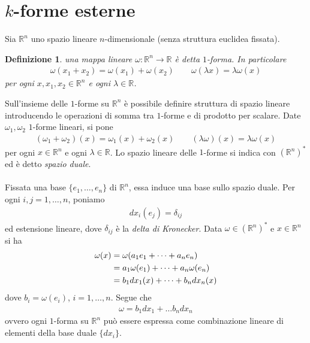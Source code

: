 \documentclass[oneside, 11pt]{amsbook}
\newcommand{\0}{{(0)}}
\newcommand{\3}{{(3)}}
\theoremstyle{colonplain}
\theoremstyle{colondefinition}
\newtheorem{defn}[thm]{Definizione}
\theoremstyle{colonremark}
\numberwithin{equation}{chapter}
\begin{document}
\section{\texorpdfstring{$k$-forme esterne}{Pk-forme esterne}}
Sia $\mathbb{R}^n$ uno spazio lineare $n$-dimensionale (senza struttura euclidea fissata).
\begin{defn} una mappa lineare $\omega : \mathbb{R}^n \longrightarrow \mathbb{R}$ è detta $1$-\textit{forma}. In particolare 
\begin{align}
    \omega(x_1 + x_2) = \omega(x_1) + \omega(x_2) \qquad \omega(\lambda x) = \lambda\omega(x) 
\end{align}
per ogni $x, x_1, x_2 \in \mathbb{R}^n$ e ogni $\lambda \in \mathbb{R}$.
\end{defn}
Sull'insieme delle $1$-forme su $\mathbb{R}^n$ è possibile definire struttura di spazio lineare introducendo le operazioni di somma tra $1$-forme e di prodotto per scalare. Date $\omega_1, \omega_2$ $1$-forme lineari, si pone 
\begin{align}
    (\omega_1 + \omega_2)(x) = \omega_1(x) + \omega_2(x) \qquad (\lambda\omega)(x) = \lambda\omega(x) 
\end{align}
per ogni $x \in \mathbb{R}^n$ e ogni $\lambda \in \mathbb{R}$. Lo spazio lineare delle $1$-forme si indica con $(\mathbb{R}^n)^*$ ed è detto \textit{spazio duale}. \\ \\
Fissata una base $\{e_1, \dots, e_n\}$ di $\mathbb{R}^n$, essa induce una base sullo spazio duale. Per ogni $i, j = 1, \dots, n$, poniamo
\begin{align}
    dx_i(e_j) = \delta_{ij} 
\end{align}
ed estensione lineare, dove $\delta_{ij}$ è la \textit{delta di Kronecker}. Data $\omega \in (\mathbb{R}^n)^*$ e $x \in \mathbb{R}^n$ si ha 
\begin{align}
    \omega(x) &= \omega(a_1e_1 + \dots + a_ne_n) \notag \\
    &= a_1\omega(e_1) + \dots + a_n\omega(e_n) \notag \\
    &= b_1dx_1(x) + \dots + b_ndx_n(x) \notag
\end{align}
dove $b_i = \omega(e_i)$, $i = 1, \dots, n$. Segue che 
\begin{align}
    \omega = b_1dx_1 + \dots b_ndx_n 
\end{align}
ovvero ogni $1$-forma su $\mathbb{R}^n$ può essere espressa come combinazione lineare di elementi della base duale $\{dx_i\}$. \\
\end{document}
